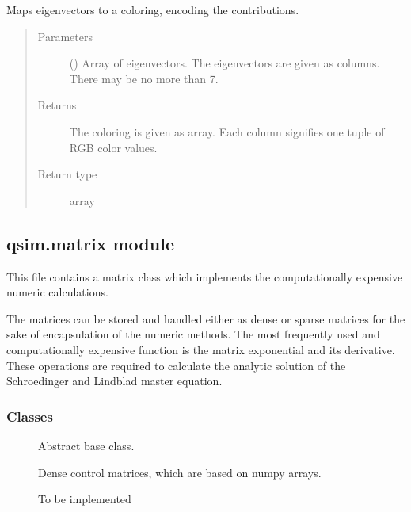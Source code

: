 \documentclass[letterpaper,10pt,english]{sphinxmanual}
\begin{document}
\begin{fulllineitems}
\label{\detokenize{qsim:qsim.energy_spectrum.vector_color_map}}
Maps eigenvectors to a coloring, encoding the contributions.
\begin{quote}\begin{description}
\item[{Parameters}] \leavevmode
{} () \textendash{} Array of eigenvectors. The eigenvectors are given as columns. There
may be no more than 7.

\item[{Returns}] \leavevmode
{} \textendash{} The coloring is given as array. Each column signifies one tuple of
RGB color values.

\item[{Return type}] \leavevmode
array

\end{description}\end{quote}

\end{fulllineitems}



\subsection{qsim.matrix module}
\label{\detokenize{qsim:module-qsim.matrix}}\label{\detokenize{qsim:qsim-matrix-module}}
This file contains a matrix class which implements the computationally
expensive numeric calculations.

The matrices can be stored and handled either as dense or sparse
matrices for the sake of encapsulation of the numeric methods.
The most frequently used and computationally expensive function is
the matrix exponential and its derivative. These operations are required to
calculate the analytic solution of the Schroedinger and Lindblad master
equation.


\subsubsection{Classes}
\label{\detokenize{qsim:id14}}\begin{description}
\item[{{\hyperref[\detokenize{qsim:qsim.matrix.OperatorMatrix}]{}}}] \leavevmode
Abstract base class.

\item[{}] \leavevmode
Dense control matrices, which are based on numpy arrays.

\item[{}] \leavevmode
To be implemented

\end{description}
\end{document}
